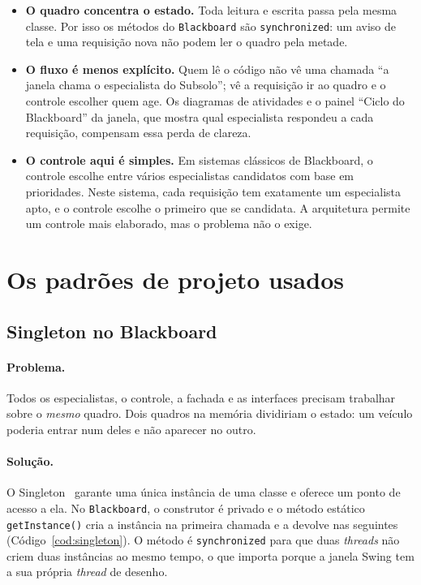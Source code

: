 \begin{itemize}
  \item \textbf{O quadro concentra o estado.} Toda leitura e escrita passa pela mesma classe. Por isso os métodos do \texttt{Blackboard} são \texttt{synchronized}: um aviso de tela e uma requisição nova não podem ler o quadro pela metade.
  \item \textbf{O fluxo é menos explícito.} Quem lê o código não vê uma chamada ``a janela chama o especialista do Subsolo''; vê a requisição ir ao quadro e o controle escolher quem age. Os diagramas de atividades e o painel ``Ciclo do Blackboard'' da janela, que mostra qual especialista respondeu a cada requisição, compensam essa perda de clareza.
  \item \textbf{O controle aqui é simples.} Em sistemas clássicos de Blackboard, o controle escolhe entre vários especialistas candidatos com base em prioridades. Neste sistema, cada requisição tem exatamente um especialista apto, e o controle escolhe o primeiro que se candidata. A arquitetura permite um controle mais elaborado, mas o problema não o exige.
\end{itemize}

\section{Os padrões de projeto usados}

\subsection{Singleton no Blackboard}

\paragraph{Problema.} Todos os especialistas, o controle, a fachada e as interfaces precisam trabalhar sobre o \emph{mesmo} quadro. Dois quadros na memória dividiriam o estado: um veículo poderia entrar num deles e não aparecer no outro.

\paragraph{Solução.} O Singleton~\cite{gamma1994} garante uma única instância de uma classe e oferece um ponto de acesso a ela. No \texttt{Blackboard}, o construtor é privado e o método estático \texttt{getInstance()} cria a instância na primeira chamada e a devolve nas seguintes (Código~\ref{cod:singleton}). O método é \texttt{synchronized} para que duas \emph{threads} não criem duas instâncias ao mesmo tempo, o que importa porque a janela Swing tem a sua própria \emph{thread} de desenho.

